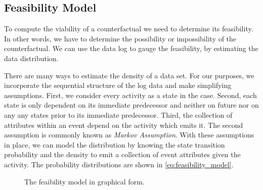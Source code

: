 \documentclass[./../../paper.tex]{subfiles}
\begin{document}
\subsection{Feasibility Model}
To compute the viability of a counterfactual we need to determine its feasibility. In other words, we have to determine the possibility or impossibility of the counterfactual. We can use the data log to gauge the feasibility, by estimating the data distribution.

There are many ways to estimate the density of a data set. For our purposes, we incorporate the sequential structure of the log data and make simplifying assumptions. First, we consider every activity as a state in the case. Second, each state is only dependent on its immediate predecessor and neither on future nor on any any states prior to its immediate predecessor. Third, the collection of attributes within an event depend on the activity which emits it. The second assumption is commonly known as \emph{Markov Assumption}. With these assumptions in place, we can model the distribution by knowing the state transition probability and the density to emit a collection of event attributes given the activity. The probability distributions are shown in \autoref{eq:feasibility_model}.


\begin{figure}[htbp]
    \centering
    \caption{The feaibility model in graphical form.}
    \label{fig:markov_model}
\end{figure}
\end{document}
